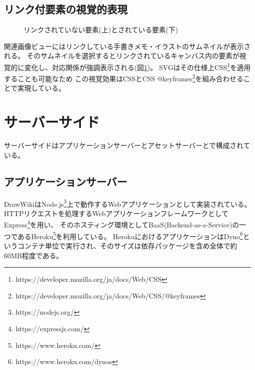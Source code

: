 \subsection{リンク付要素の視覚的表現}

\begin{figure}[htbp]
    \begin{center}
         \end{center}
    \caption{リンクされていない要素(上)とされている要素(下)} \label{linkedelm}
\end{figure}

関連画像ビューにはリンクしている手書きメモ・イラストのサムネイルが表示される。
そのサムネイルを選択するとリンクされているキャンバス内の要素が視覚的に変化し、対応関係が強調表示される(図\ref{linkedelm})。
SVGはその仕様上CSS\footnote{https://developer.mozilla.org/ja/docs/Web/CSS}を適用することも可能なため
この視覚効果はCSSとCSS @keyframes\footnote{https://developer.mozilla.org/ja/docs/Web/CSS/@keyframes}を組み合わせることで実現している。

\section{サーバーサイド}
サーバーサイドはアプリケーションサーバーとアセットサーバーとで構成されている。

\subsection{アプリケーションサーバー}
DrawWikiはNode.js\footnote{https://nodejs.org/}上で動作するWebアプリケーションとして実装されている。
HTTPリクエストを処理するWebアプリケーションフレームワークとしてExpress\footnote{https://expressjs.com/}を用い、
そのホスティング環境としてBaaS(Backend-as-a-Service)の一つであるHeroku\footnote{https://www.heroku.com/}を利用している。
HerokuにおけるアプリケーションはDyno\footnote{https://www.heroku.com/dynos}というコンテナ単位で実行され、そのサイズは依存パッケージを含め全体で約60MB程度である。

